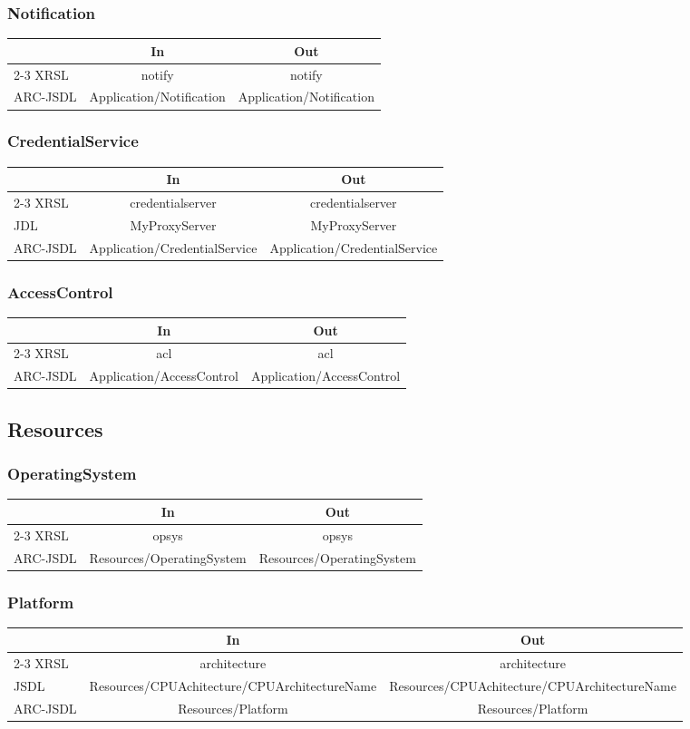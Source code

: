\documentclass{article}
\newenvironment{inouttabular}%
{\begin{center}\begin{tabular}{l>{\ttfamily\footnotesize}c>{\ttfamily\footnotesize}c}%
\toprule
& \textnormal{\normalsize{In}} & \textnormal{\normalsize{Out}}\\ \cmidrule{2-3}}
{\bottomrule\end{tabular}\end{center}}
\begin{document}
\subsubsection{Notification}
\begin{inouttabular}
XRSL & notify & notify\\
ARC-JSDL & Application/Notification & Application/Notification\\
\end{inouttabular}

\subsubsection{CredentialService}
\begin{inouttabular}
XRSL & credentialserver & credentialserver\\
JDL & MyProxyServer & MyProxyServer\\
ARC-JSDL & Application/CredentialService & Application/CredentialService\\
\end{inouttabular}

\subsubsection{AccessControl}
\begin{inouttabular}
XRSL & acl & acl\\
ARC-JSDL & Application/AccessControl & Application/AccessControl\\
\end{inouttabular}

\subsection{Resources}
\subsubsection{OperatingSystem}
\begin{inouttabular}
XRSL & opsys & opsys\\
ARC-JSDL & Resources/OperatingSystem & Resources/OperatingSystem\\
\end{inouttabular}

\subsubsection{Platform}
\begin{inouttabular}
XRSL & architecture & architecture\\
JSDL & Resources/CPUAchitecture/CPUArchitectureName & Resources/CPUAchitecture/CPUArchitectureName\\
ARC-JSDL & Resources/Platform & Resources/Platform\\
\end{inouttabular}
\end{document}
